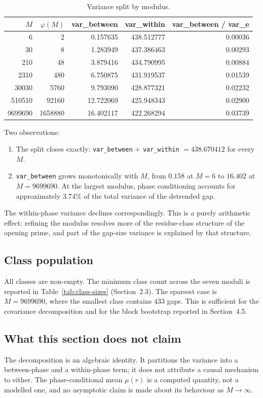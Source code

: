 \begin{table}[ht]
\centering
\caption{Variance split by modulus.}
\label{tab:variance-split}
\begin{tabular}{rrrrr}
\toprule
$M$ & $\varphi(M)$ & var\_between & var\_within & var\_between / var\_e \\
\midrule
6 & 2 & 0.157635 & 438.512777 & 0.00036 \\
30 & 8 & 1.283949 & 437.386463 & 0.00293 \\
210 & 48 & 3.879416 & 434.790995 & 0.00884 \\
2310 & 480 & 6.750875 & 431.919537 & 0.01539 \\
30030 & 5760 & 9.793090 & 428.877321 & 0.02232 \\
510510 & 92160 & 12.722069 & 425.948343 & 0.02900 \\
9699690 & 1658880 & 16.402117 & 422.268294 & 0.03739 \\
\bottomrule
\end{tabular}
\end{table}

Two observations:

\begin{enumerate}
\item The split closes exactly: \texttt{var\_between} $+$ \texttt{var\_within} $= 438.670412$ for every $M$.
\item \texttt{var\_between} grows monotonically with $M$, from $0.158$ at $M=6$ to $16.402$ at $M=9699690$. At the largest modulus, phase conditioning accounts for approximately $3.74\%$ of the total variance of the detrended gap.
\end{enumerate}

The within-phase variance declines correspondingly. This is a purely arithmetic effect: refining the modulus resolves more of the residue-class structure of the opening prime, and part of the gap-size variance is explained by that structure.

\subsection{Class population}

All classes are non-empty. The minimum class count across the seven moduli is reported in Table~\ref{tab:class-sizes} (Section~2.3). The sparsest case is $M=9699690$, where the smallest class contains $433$ gaps. This is sufficient for the covariance decomposition and for the block bootstrap reported in Section~4.5.

\subsection{What this section does not claim}

The decomposition is an algebraic identity. It partitions the variance into a between-phase and a within-phase term; it does not attribute a causal mechanism to either. The phase-conditional mean $\mu(r)$ is a computed quantity, not a modelled one, and no asymptotic claim is made about its behaviour as $M\to\infty$.
